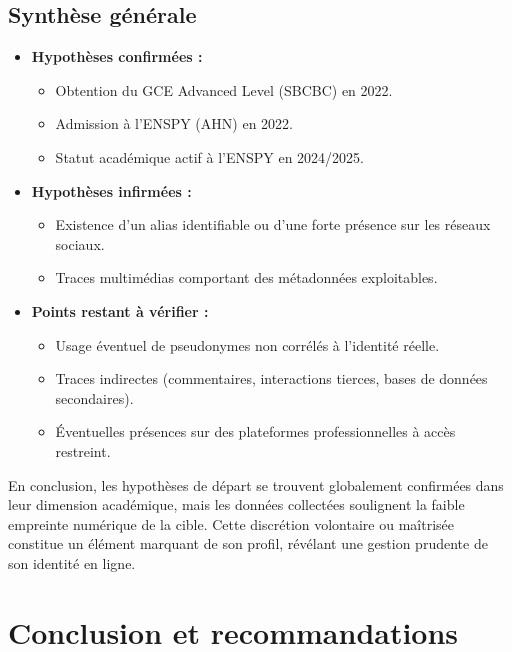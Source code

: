 \documentclass[a4paper,12pt]{report}
\begin{document}
\section{Synthèse générale}

\begin{itemize}
	\item \textbf{Hypothèses confirmées :}
	\begin{itemize}
		\item Obtention du GCE Advanced Level (SBCBC) en 2022.  
		\item Admission à l’ENSPY (AHN) en 2022.  
		\item Statut académique actif à l’ENSPY en 2024/2025.
	\end{itemize}

	\item \textbf{Hypothèses infirmées :}
	\begin{itemize}
		\item Existence d’un alias identifiable ou d’une forte présence sur les réseaux sociaux.  
		\item Traces multimédias comportant des métadonnées exploitables.
	\end{itemize}

	\item \textbf{Points restant à vérifier :}
	\begin{itemize}
		\item Usage éventuel de pseudonymes non corrélés à l’identité réelle.  
		\item Traces indirectes (commentaires, interactions tierces, bases de données secondaires).  
		\item Éventuelles présences sur des plateformes professionnelles à accès restreint.
	\end{itemize}
\end{itemize}

\bigskip
\noindent
En conclusion, les hypothèses de départ se trouvent globalement confirmées dans leur dimension académique, mais les données collectées soulignent la faible empreinte numérique de la cible.  
Cette discrétion volontaire ou maîtrisée constitue un élément marquant de son profil, révélant une gestion prudente de son identité en ligne.


\chapter{Conclusion et recommandations}
\end{document}
